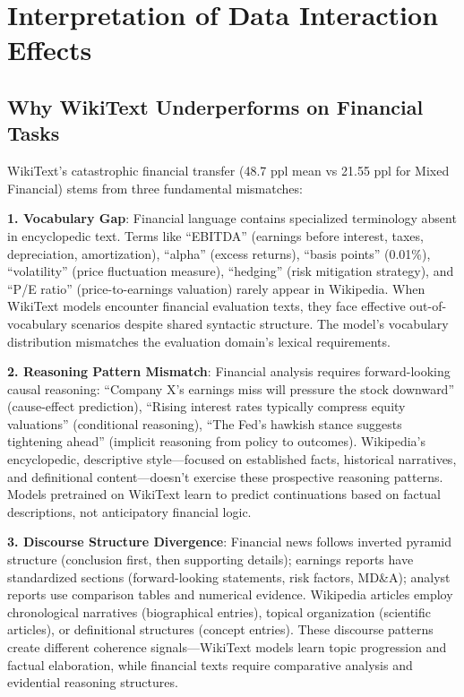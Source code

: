 \section{Interpretation of Data Interaction Effects}

\subsection{Why WikiText Underperforms on Financial Tasks}

WikiText's catastrophic financial transfer (48.7 ppl mean vs 21.55 ppl for Mixed Financial) stems from three fundamental mismatches:

\textbf{1. Vocabulary Gap}: Financial language contains specialized terminology absent in encyclopedic text. Terms like ``EBITDA'' (earnings before interest, taxes, depreciation, amortization), ``alpha'' (excess returns), ``basis points'' (0.01\%), ``volatility'' (price fluctuation measure), ``hedging'' (risk mitigation strategy), and ``P/E ratio'' (price-to-earnings valuation) rarely appear in Wikipedia. When WikiText models encounter financial evaluation texts, they face effective out-of-vocabulary scenarios despite shared syntactic structure. The model's vocabulary distribution mismatches the evaluation domain's lexical requirements.

\textbf{2. Reasoning Pattern Mismatch}: Financial analysis requires forward-looking causal reasoning: ``Company X's earnings miss will pressure the stock downward'' (cause-effect prediction), ``Rising interest rates typically compress equity valuations'' (conditional reasoning), ``The Fed's hawkish stance suggests tightening ahead'' (implicit reasoning from policy to outcomes). Wikipedia's encyclopedic, descriptive style—focused on established facts, historical narratives, and definitional content—doesn't exercise these prospective reasoning patterns. Models pretrained on WikiText learn to predict continuations based on factual descriptions, not anticipatory financial logic.

\textbf{3. Discourse Structure Divergence}: Financial news follows inverted pyramid structure (conclusion first, then supporting details); earnings reports have standardized sections (forward-looking statements, risk factors, MD\&A); analyst reports use comparison tables and numerical evidence. Wikipedia articles employ chronological narratives (biographical entries), topical organization (scientific articles), or definitional structures (concept entries). These discourse patterns create different coherence signals—WikiText models learn topic progression and factual elaboration, while financial texts require comparative analysis and evidential reasoning structures.

